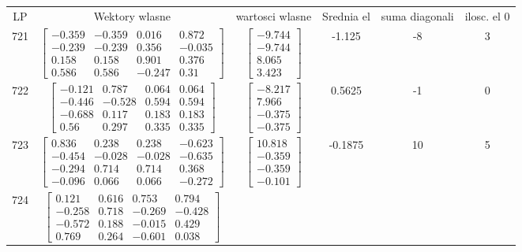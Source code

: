 \documentclass[a4paper,12pt]{article}
\begin{document}
\bgroup {} \vspace{0.2in} \begin{tabular}{c c c c c c}
LP &Wektory wlasne & wartosci wlasne & Srednia el & suma diagonali & ilosc. el 0\\
721
&
$\begin{bmatrix} -0.359 & -0.359 & 0.016 & 0.872 \\ -0.239 & -0.239 & 0.356 & -0.035 \\ 0.158 & 0.158 & 0.901 & 0.376 \\ 0.586 & 0.586 & -0.247 & 0.31 \end{bmatrix}$
&
$\begin{bmatrix} -9.744 \\ -9.744 \\ 8.065 \\ 3.423 \end{bmatrix}$
&
-1.125
&
-8
&
3
\\
722
&
$\begin{bmatrix} -0.121 & 0.787 & 0.064 & 0.064 \\ -0.446 & -0.528 & 0.594 & 0.594 \\ -0.688 & 0.117 & 0.183 & 0.183 \\ 0.56 & 0.297 & 0.335 & 0.335 \end{bmatrix}$
&
$\begin{bmatrix} -8.217 \\ 7.966 \\ -0.375 \\ -0.375 \end{bmatrix}$
&
0.5625
&
-1
&
0
\\
723
&
$\begin{bmatrix} 0.836 & 0.238 & 0.238 & -0.623 \\ -0.454 & -0.028 & -0.028 & -0.635 \\ -0.294 & 0.714 & 0.714 & 0.368 \\ -0.096 & 0.066 & 0.066 & -0.272 \end{bmatrix}$
&
$\begin{bmatrix} 10.818 \\ -0.359 \\ -0.359 \\ -0.101 \end{bmatrix}$
&
-0.1875
&
10
&
5
\\
724
&
$\begin{bmatrix} 0.121 & 0.616 & 0.753 & 0.794 \\ -0.258 & 0.718 & -0.269 & -0.428 \\ -0.572 & 0.188 & -0.015 & 0.429 \\ 0.769 & 0.264 & -0.601 & 0.038 \end{bmatrix}$

\end{tabular}
\end{document}
